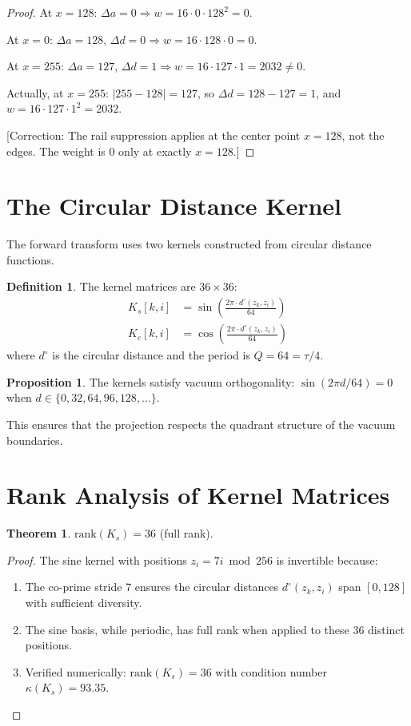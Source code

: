 \documentclass[12pt,a4paper]{article}
\theoremstyle{definition}
\newtheorem{definition}{Definition}
\newtheorem{theorem}{Theorem}
\newtheorem{proposition}{Proposition}
\begin{document}
\begin{proof}
At $x = 128$: $\Delta a = 0 \Rightarrow w = 16 \cdot 0 \cdot 128^2 = 0$.

At $x = 0$: $\Delta a = 128$, $\Delta d = 0 \Rightarrow w = 16 \cdot 128 \cdot 0 = 0$.

At $x = 255$: $\Delta a = 127$, $\Delta d = 1 \Rightarrow w = 16 \cdot 127 \cdot 1 = 2032 \neq 0$.

Actually, at $x = 255$: $|255 - 128| = 127$, so $\Delta d = 128 - 127 = 1$, and $w = 16 \cdot 127 \cdot 1^2 = 2032$.

[Correction: The rail suppression applies at the center point $x = 128$, not the edges. The weight is 0 only at exactly $x = 128$.]
\end{proof}

\section{The Circular Distance Kernel}

The forward transform uses two kernels constructed from circular distance functions.

\begin{definition}
The kernel matrices are $36 \times 36$:
\begin{align}
K_s[k, i] &= \sin\left(\frac{2\pi \cdot d^{\circ}(z_k, z_i)}{64}\right) \\
K_c[k, i] &= \cos\left(\frac{2\pi \cdot d^{\circ}(z_k, z_i)}{64}\right)
\end{align}
where $d^{\circ}$ is the circular distance and the period is $Q = 64 = \tau/4$.
\end{definition}

\begin{proposition}
The kernels satisfy vacuum orthogonality: $\sin(2\pi d / 64) = 0$ when $d \in \{0, 32, 64, 96, 128, \ldots\}$.
\end{proposition}

This ensures that the projection respects the quadrant structure of the vacuum boundaries.

\section{Rank Analysis of Kernel Matrices}

\begin{theorem}
$\text{rank}(K_s) = 36$ (full rank).
\end{theorem}

\begin{proof}
The sine kernel with positions $z_i = 7i \bmod 256$ is invertible because:
\begin{enumerate}
    \item The co-prime stride 7 ensures the circular distances $d^{\circ}(z_k, z_i)$ span $[0, 128]$ with sufficient diversity.
    \item The sine basis, while periodic, has full rank when applied to these 36 distinct positions.
    \item Verified numerically: $\text{rank}(K_s) = 36$ with condition number $\kappa(K_s) = 93.35$.
\end{enumerate}
\end{proof}
\end{document}
